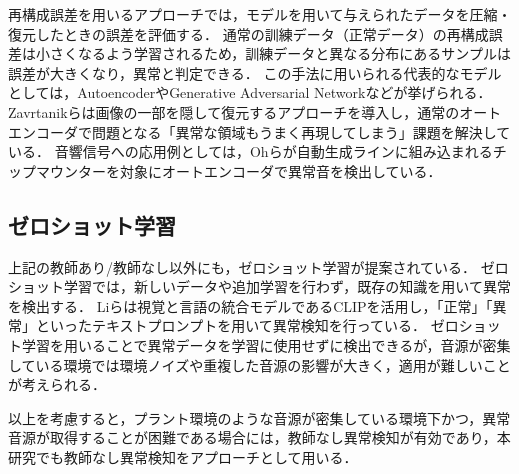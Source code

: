 \documentclass[../main]{subfiles}
\begin{document}
再構成誤差を用いるアプローチでは，モデルを用いて与えられたデータを圧縮・復元したときの誤差を評価する．
通常の訓練データ（正常データ）の再構成誤差は小さくなるよう学習されるため，訓練データと異なる分布にあるサンプルは誤差が大きくなり，異常と判定できる．
この手法に用いられる代表的なモデルとしては，AutoencoderやGenerative Adversarial Networkなどが挙げられる．
Zavrtanikらは画像の一部を隠して復元するアプローチを導入し，通常のオートエンコーダで問題となる「異常な領域もうまく再現してしまう」課題を解決している\cite{zavrtanik}．
音響信号への応用例としては，Ohらが自動生成ラインに組み込まれるチップマウンターを対象にオートエンコーダで異常音を検出している\cite{oh}．


\subsection{ゼロショット学習}
上記の教師あり/教師なし以外にも，ゼロショット学習が提案されている．
ゼロショット学習では，新しいデータや追加学習を行わず，既存の知識を用いて異常を検出する．
Liらは視覚と言語の統合モデルであるCLIPを活用し，「正常」「異常」といったテキストプロンプトを用いて異常検知を行っている\cite{li}．
ゼロショット学習を用いることで異常データを学習に使用せずに検出できるが，音源が密集している環境では環境ノイズや重複した音源の影響が大きく，適用が難しいことが考えられる．


以上を考慮すると，プラント環境のような音源が密集している環境下かつ，異常音源が取得することが困難である場合には，教師なし異常検知が有効であり，本研究でも教師なし異常検知をアプローチとして用いる．
\end{document}
